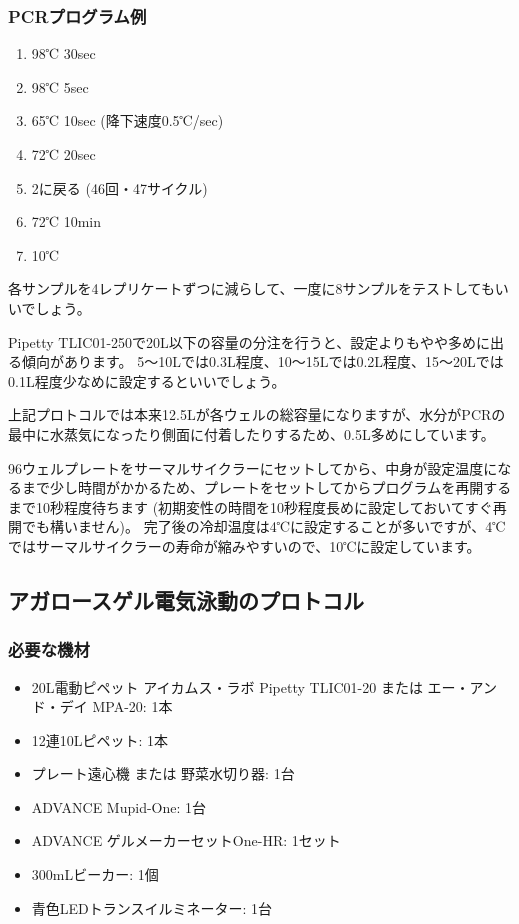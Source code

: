 \documentclass[titlepage,10pt,a4paper,uplatex]{jsbook}
\begin{document}
\subsubsection{PCRプログラム例}
\begin{enumerate}
\item 98℃ 30sec
\item 98℃ 5sec
\item 65℃ 10sec (降下速度0.5℃/sec)
\item 72℃ 20sec
\item 2に戻る (46回・47サイクル)
\item 72℃ 10min
\item 10℃
\end{enumerate}

各サンプルを4レプリケートずつに減らして、一度に8サンプルをテストしてもいいでしょう。

Pipetty TLIC01-250で20{\textmu}L以下の容量の分注を行うと、設定よりもやや多めに出る傾向があります。
5～10{\textmu}Lでは0.3{\textmu}L程度、10～15{\textmu}Lでは0.2{\textmu}L程度、15～20{\textmu}Lでは0.1{\textmu}L程度少なめに設定するといいでしょう。

上記プロトコルでは本来12.5{\textmu}Lが各ウェルの総容量になりますが、水分がPCRの最中に水蒸気になったり側面に付着したりするため、0.5{\textmu}L多めにしています。

96ウェルプレートをサーマルサイクラーにセットしてから、中身が設定温度になるまで少し時間がかかるため、プレートをセットしてからプログラムを再開するまで10秒程度待ちます (初期変性の時間を10秒程度長めに設定しておいてすぐ再開でも構いません)。
完了後の冷却温度は4℃に設定することが多いですが、4℃ではサーマルサイクラーの寿命が縮みやすいので、10℃に設定しています。

\subsection{アガロースゲル電気泳動のプロトコル}

\subsubsection{必要な機材}
\begin{itemize}
\item 20{\textmu}L電動ピペット アイカムス・ラボ Pipetty TLIC01-20 または エー・アンド・デイ MPA-20: 1本
\item 12連10{\textmu}Lピペット: 1本
\item プレート遠心機 または 野菜水切り器: 1台
\item ADVANCE Mupid-One: 1台
\item ADVANCE ゲルメーカーセットOne-HR: 1セット
\item 300mLビーカー: 1個
\item 青色LEDトランスイルミネーター: 1台
\end{itemize}
\end{document}
